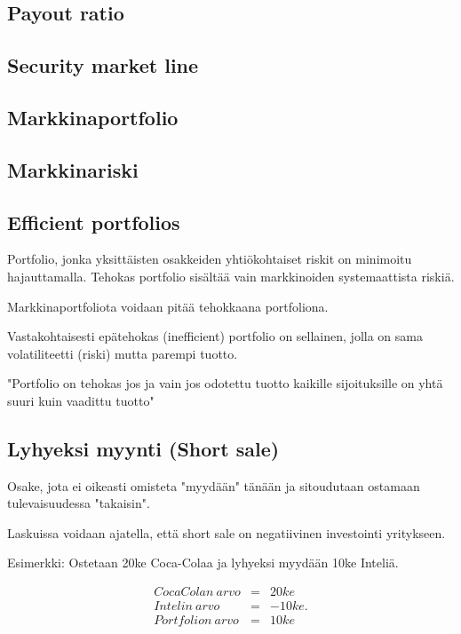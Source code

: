 \documentclass[a4paper]{article}
\begin{document}
\subsection{Payout ratio}

\subsection{Security market line}

\subsection{Markkinaportfolio}

\subsection{Markkinariski}

\subsection{Efficient portfolios}

Portfolio, jonka yksittäisten osakkeiden yhtiökohtaiset riskit on minimoitu hajauttamalla. Tehokas portfolio sisältää vain markkinoiden systemaattista riskiä.

Markkinaportfoliota voidaan pitää tehokkaana portfoliona.

Vastakohtaisesti epätehokas (inefficient) portfolio on sellainen, jolla on sama volatiliteetti (riski) mutta parempi tuotto.

"Portfolio on tehokas jos ja vain jos odotettu tuotto kaikille sijoituksille on yhtä suuri kuin vaadittu tuotto"

\subsection{Lyhyeksi myynti (Short sale)}

Osake, jota ei oikeasti omisteta "myydään" tänään ja sitoudutaan ostamaan tulevaisuudessa "takaisin".

Laskuissa voidaan ajatella, että short sale on negatiivinen investointi yritykseen.

Esimerkki: Ostetaan 20ke Coca-Colaa ja lyhyeksi myydään 10ke Inteliä. 

\[
\begin{array}{lcl}
    CocaColan\ arvo & = & 20ke \\
    Intelin\ arvo & = & -10ke. \\
    Portfolion\ arvo & = & 10ke
\end{array}
\]
\end{document}
